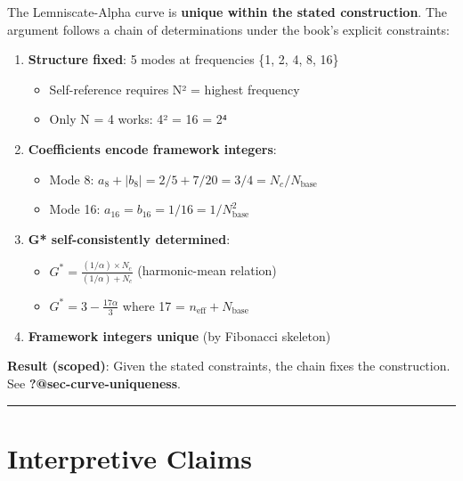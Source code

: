 \documentclass[
  11pt,
  letterpaper,
  twoside,
  openany]{book}
\makeatletter
\providecommand{\tightlist}{%
  \setlength{\itemsep}{0pt}\setlength{\parskip}{0pt}}
\let\orig@section\section
\renewcommand{\section}{\needspace{8\baselineskip}\orig@section}
\makeatother
\begin{document}
The Lemniscate-Alpha curve is \textbf{unique within the stated
construction}. The argument follows a chain of determinations under the
book's explicit constraints:

\begin{enumerate}
\def\labelenumi{\arabic{enumi}.}
\tightlist
\item
  \textbf{Structure fixed}: 5 modes at frequencies \{1, 2, 4, 8, 16\}

  \begin{itemize}
  \tightlist
  \item
    Self-reference requires N² = highest frequency
  \item
    Only N = 4 works: 4² = 16 = 2⁴
  \end{itemize}
\item
  \textbf{Coefficients encode framework integers}:

  \begin{itemize}
  \tightlist
  \item
    Mode 8: \(a_8 + |b_8| = 2/5 + 7/20 = 3/4 = N_c/N_{\text{base}}\)
  \item
    Mode 16: \(a_{16} = b_{16} = 1/16 = 1/N_{\text{base}}^2\)
  \end{itemize}
\item
  \textbf{G* self-consistently determined}:

  \begin{itemize}
  \tightlist
  \item
    \(G^* = \frac{(1/\alpha) \times N_c}{(1/\alpha) + N_c}\)
    (harmonic-mean relation)
  \item
    \(G^* = 3 - \frac{17\alpha}{3}\) where 17 =
    \(n_{\text{eff}} + N_{\text{base}}\)
  \end{itemize}
\item
  \textbf{Framework integers unique} (by Fibonacci skeleton)
\end{enumerate}

\textbf{Result (scoped)}: Given the stated constraints, the chain fixes
the construction. See \textbf{?@sec-curve-uniqueness}.

\begin{center}\rule{0.5\linewidth}{0.5pt}\end{center}

\section{Interpretive Claims}\label{interpretive-claims}
\end{document}
